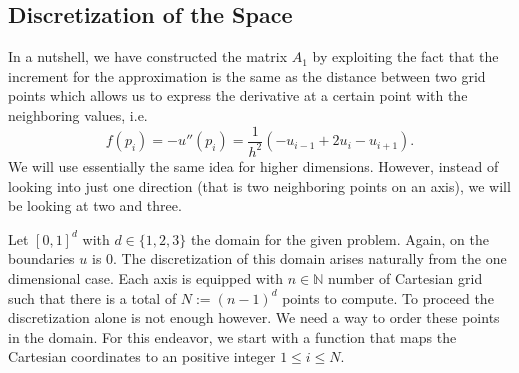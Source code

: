 \subsection{Discretization of the Space}

In a nutshell, we have constructed the matrix \(A_1\) by exploiting the fact that the increment for the approximation is the same as the distance between two grid points which allows us to express the derivative at a certain point with the neighboring values, i.e.
\[
f(p_i) = -u''(p_i) = \frac{1}{h^2} (-u_{i - 1} + 2 u_i - u_{i + 1}) \text{.}
\]
We will use essentially the same idea for higher dimensions. However, instead of looking into just one direction (that is two neighboring points on an axis), we will be looking at two and three.

Let \([0,1]^{d}\) with \(d \in \{1, 2, 3\}\) the domain for the given problem. Again, on the boundaries \(u\) is \(0\). The discretization of this domain arises naturally from the one dimensional case. Each axis is equipped with \(n \in \mathbb{N}\) number of Cartesian grid such that there is a total of \( N := (n-1)^d\) points to compute. To proceed the discretization alone is not enough however. We need a way to order these points in the domain. For this endeavor, we start with a function that maps the Cartesian coordinates to an positive integer \(1 \leq i \leq N\).

